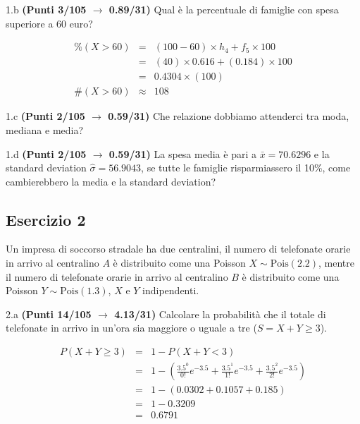 \documentclass[
  11pt,
]{book}
\theoremstyle{mytheoremstyle}
\theoremstyle{mydefstyle}
\newenvironment{sol}
  {
  \begin{tcolorbox}[enhanced,breakable,arc=0.1mm,boxrule=1pt,colback=white,colframe=iblue,
  title=\bf \fontfamily{lmss}\selectfont \hspace{.5 cm} Soluzione,drop fuzzy shadow]

}{
\end{tcolorbox}
  }
\begin{document}
1.b \textbf{(Punti 3/105 \(\rightarrow\) 0.89/31)} Qual è la percentuale di famiglie con spesa superiore a 60 euro?

\begin{sol}
\begin{eqnarray*}
     \%(X> 60 ) &=& ( 100 - 60 )\times h_{ 4 }+ f_{ 5 }\times 100 \\
              &=& ( 40 )\times 0.616 + ( 0.184 )\times 100 \\
              &=&  0.4304 \times(100)\\
     \#(X> 60 ) &\approx& 108 
         \end{eqnarray*}

\end{sol}

1.c \textbf{(Punti 2/105 \(\rightarrow\) 0.59/31)} Che relazione dobbiamo attenderci tra moda, mediana e media?

1.d \textbf{(Punti 2/105 \(\rightarrow\) 0.59/31)} La spesa media è pari a \(\bar x=70.6296\) e la standard deviation \(\hat\sigma=56.9043\), se tutte le famiglie risparmiassero
il 10\%, come cambierebbero la media e la standard deviation?

\subsection{Esercizio 2}\label{esercizio-2-29}

Un impresa di soccorso stradale ha due centralini, il numero di telefonate orarie in arrivo
al centralino \(A\) è distribuito come una Poisson \(X\sim\text{Pois}(2.2)\), mentre
il numero di telefonate orarie in arrivo al centralino \(B\) è distribuito come una Poisson \(Y\sim\text{Pois}(1.3)\),
\(X\) e \(Y\) indipendenti.

2.a \textbf{(Punti 14/105 \(\rightarrow\) 4.13/31)} Calcolare la probabilità che il totale di telefonate in arrivo in un'ora sia maggiore
o uguale a tre (\(S=X+Y\ge 3\)).

\begin{sol}
\begin{eqnarray*}
   P( X+Y \geq 3 ) &=& 1-P( X+Y < 3 ) \\                 &=& 1-\left( \frac{ 3.5 ^{ 0 }}{ 0 !}e^{- 3.5 }+\frac{ 3.5 ^{ 1 }}{ 1 !}e^{- 3.5 }+\frac{ 3.5 ^{ 2 }}{ 2 !}e^{- 3.5 } \right)\\                 &=& 1-( 0.0302+0.1057+0.185 )\\                 &=& 1- 0.3209 \\                 &=&   0.6791 
\end{eqnarray*}

\end{sol}
\end{document}
